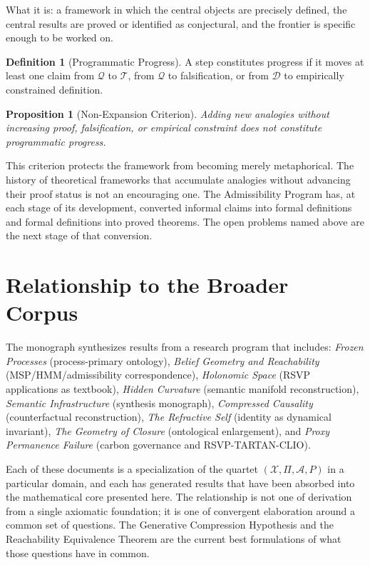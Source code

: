 \documentclass[12pt, oneside]{book}
\theoremstyle{flyxion}
\newtheorem{proposition}[theorem]{Proposition}
\theoremstyle{definition}
\newtheorem{definition}[theorem]{Definition}
\begin{document}
What it is: a framework in which the central objects
are precisely defined, the central results are proved
or identified as conjectural, and the frontier is
specific enough to be worked on.

\begin{definition}[Programmatic Progress]
A step constitutes progress if it moves at least one
claim from $\mathcal{Q}$ to $\mathcal{T}$, from
$\mathcal{Q}$ to falsification, or from $\mathcal{D}$
to empirically constrained definition.
\end{definition}

\begin{proposition}[Non-Expansion Criterion]
Adding new analogies without increasing proof,
falsification, or empirical constraint does not
constitute programmatic progress.
\end{proposition}

This criterion protects the framework from becoming
merely metaphorical. The history of theoretical
frameworks that accumulate analogies without advancing
their proof status is not an encouraging one. The
Admissibility Program has, at each stage of its
development, converted informal claims into formal
definitions and formal definitions into proved
theorems. The open problems named above are the
next stage of that conversion.

\section{Relationship to the Broader Corpus}

The monograph synthesizes results from a research
program that includes: \textit{Frozen Processes}
(process-primary ontology), \textit{Belief Geometry
and Reachability} (MSP/HMM/admissibility correspondence),
\textit{Holonomic Space} (RSVP applications as
textbook), \textit{Hidden Curvature} (semantic manifold
reconstruction), \textit{Semantic Infrastructure}
(synthesis monograph), \textit{Compressed Causality}
(counterfactual reconstruction), \textit{The Refractive
Self} (identity as dynamical invariant), \textit{The
Geometry of Closure} (ontological enlargement), and
\textit{Proxy Permanence Failure} (carbon governance
and RSVP-TARTAN-CLIO).

Each of these documents is a specialization of the
quartet $(\mathcal{X}, \Pi, \mathcal{A}, P)$ in a
particular domain, and each has generated results
that have been absorbed into the mathematical core
presented here. The relationship is not one of
derivation from a single axiomatic foundation; it
is one of convergent elaboration around a common
set of questions. The Generative Compression
Hypothesis and the Reachability Equivalence Theorem
are the current best formulations of what those
questions have in common.
\end{document}
